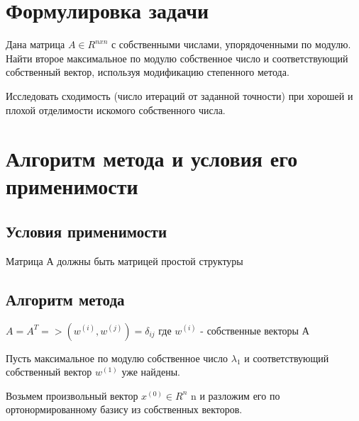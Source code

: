 






\section{Формулировка задачи}

Дана матрица 
\begin{math}
	A\in R^{nxn}
\end{math}
с собственными числами, упорядоченными по модулю. Найти второе максимальное по модулю собственное число и соответствующий собственный вектор, используя модификацию степенного метода.

Исследовать сходимость (число итераций от 
заданной точности) при хорошей и плохой отделимости искомого собственного числа. 

\section{Алгоритм метода и условия его применимости}

\subsection {Условия применимости}

Матрица А должны быть матрицей простой структуры

\subsection {Алгоритм метода}

\begin{math}
	A=A^{T} => (w^{(i)},w^{(j)})=\delta_{ij} 
\end{math}
где 
\begin{math}
	w^{(i)} 
\end{math}
- собственные векторы А

Пусть максимальное по модулю собственное число
\begin{math}
	\lambda_{1} 
\end{math} и соответствующий собственный вектор
\begin{math}
	w^{(1)} 
\end{math} уже найдены.

Возьмем произвольный вектор 
\begin{math}
	x^{(0)} \in R^{n}
\end{math}
n и разложим его по ортонормированному
базису из собственных векторов. 

